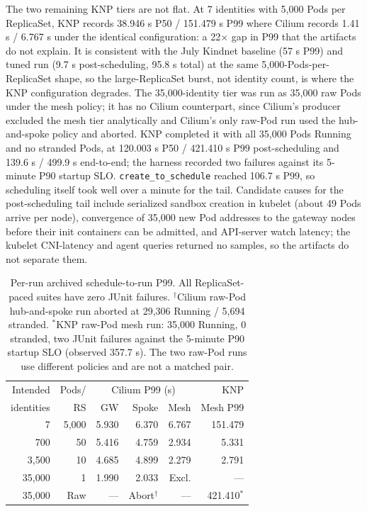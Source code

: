 \documentclass[letterpaper,twocolumn,10pt]{article}
\newcommand{\sys}{\textsc{KNP}}
\begin{document}
The two remaining \sys{} tiers are not flat. At 7 identities with 5,000
Pods per ReplicaSet, \sys{} records 38.946 s P50 / 151.479 s P99 where
Cilium records 1.41 s / 6.767 s under the identical configuration: a
22$\times$ gap in P99 that the artifacts do not explain. It is consistent
with the July Kindnet baseline (57 s P99) and tuned run (9.7 s
post-scheduling, 95.8 s total) at the same 5,000-Pods-per-ReplicaSet
shape, so the large-ReplicaSet burst, not identity count, is where the
\sys{} configuration degrades. The 35,000-identity tier was run as
35,000 raw Pods under the mesh policy; it has no Cilium counterpart, since
Cilium's producer excluded the mesh tier analytically and Cilium's only
raw-Pod run used the hub-and-spoke policy and aborted. \sys{} completed
it with all 35,000 Pods Running and no stranded Pods, at 120.003 s P50 /
421.410 s P99 post-scheduling and 139.6 s / 499.9 s end-to-end; the
harness recorded two failures against its 5-minute P90 startup SLO.
\texttt{create\_to\_schedule} reached 106.7 s P99, so scheduling itself
took well over a minute for the tail. Candidate causes for the
post-scheduling tail include serialized sandbox creation in kubelet
(about 49 Pods arrive per node), convergence of 35,000 new Pod addresses
to the gateway nodes before their init containers can be admitted, and
API-server watch latency; the kubelet CNI-latency and agent queries
returned no samples, so the artifacts do not separate them.

\begin{table}[t]
\centering
\small
\setlength{\tabcolsep}{2.5pt}
\begin{tabular}{rrrrrr}
\toprule
Intended & Pods/ & \multicolumn{3}{c}{Cilium P99 (s)} & \sys{}\\
identities & RS & GW & Spoke & Mesh & Mesh P99\\
\midrule
7 & 5,000 & 5.930 & 6.370 & 6.767 & 151.479\\
700 & 50 & 5.416 & 4.759 & 2.934 & 5.331\\
3,500 & 10 & 4.685 & 4.899 & 2.279 & 2.791\\
35,000 & 1 & 1.990 & 2.033 & Excl. & ---\\
35,000 & Raw & --- & Abort$^{\dagger}$ & --- & 421.410$^{*}$\\
\bottomrule
\end{tabular}
\caption{Per-run archived schedule-to-run P99. All ReplicaSet-paced
suites have zero JUnit failures. $^{\dagger}$Cilium raw-Pod hub-and-spoke
run aborted at 29,306 Running / 5,694 stranded. $^{*}$\sys{} raw-Pod mesh
run: 35,000 Running, 0 stranded, two JUnit failures against the 5-minute
P90 startup SLO (observed 357.7 s). The two raw-Pod runs use different
policies and are not a matched pair.}
\label{tab:identity}
\end{table}
\end{document}
